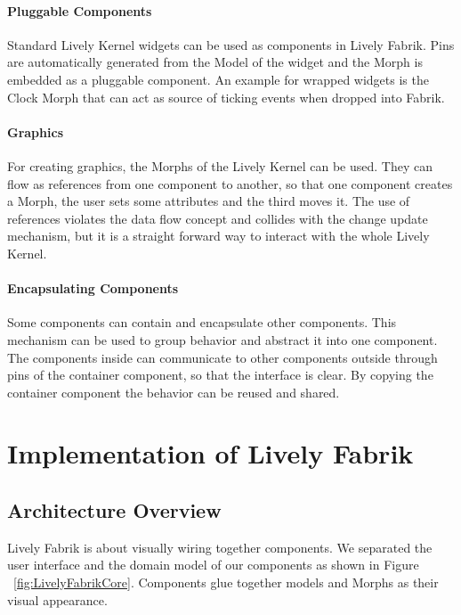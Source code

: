 \documentclass[pdftex, times, 10pt, twocolumn]{article}
\begin{document}
\paragraph{Pluggable Components}
Standard Lively Kernel widgets can be used as components in Lively Fabrik. Pins are automatically generated from the Model of the widget and the Morph is embedded as a pluggable component. An example for wrapped widgets is the Clock Morph that can act as source of ticking events when dropped into Fabrik.  



\paragraph{Graphics}
For creating graphics, the Morphs of the Lively Kernel can be used. They can flow as references from one component to another, so that one component creates a Morph, the user sets some attributes and the third moves it. The use of references violates the data flow concept and collides with the change update mechanism, but it is a straight forward way to interact with the whole Lively Kernel. 



\paragraph{Encapsulating Components}
Some components can contain and encapsulate other components. This mechanism can be used to group behavior and abstract it into one component. The components inside can communicate to other components outside through pins of the container component, so that the interface is clear. By copying the container component the behavior can be reused and shared.  



\section{Implementation of Lively Fabrik}


\subsection{Architecture Overview}
Lively Fabrik is about visually wiring together components. We separated the user interface and the domain model of our components as shown in Figure ~\ref{fig:LivelyFabrikCore}. Components glue together models and Morphs as their visual appearance.  
\end{document}
